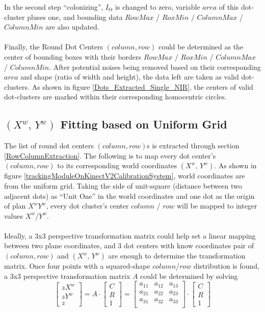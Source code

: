 %
In the second step \enquote{colonizing},  \(I_{\text{O}}\) is changed to zero, variable \(area\) of this dot-cluster pluses one, and bounding data \(RowMax\) / \(RoxMin\) / \(ColumnMax\) / \(ColumnMin\) are also updated.%
\\\\%
Finally, the Round Dot Centers \((column, row)\) could be determined as the center of bounding boxes with their borders \(RowMax\) / \(RoxMin\) / \(ColumnMax\) / \(ColumnMin\). After potential noises being removed based on their corresponding \(area\) and shape (ratio of width and height), the data left are taken as valid dot-clusters. As shown in figure \ref{Dots_Extracted_Single_NIR}, the centers of valid dot-clusters are marked within their corresponding homocentric circles.
%
%
\subsection{\((X^w, \,Y^w)\) Fitting based on Uniform Grid}
%
The list of round dot centers \((column, row)\)s is extracted through section \ref{RowColumnExtraction}. The following is to map every dot center's \((column, row)\) to its corresponding world coordinates \((X^w, \,Y^w)\). As shown in figure \ref{trackingModuleOnKinectV2CalibrationSystem}, world coordinates are from the uniform grid. Taking the side of unit-square (distance between two adjacent dots) as \enquote{Unit One} in the world coordinates and one dot as the origin of plan \(X^wY^w\), every dot cluster's center \(column\) / \(row\) will be mapped to integer values \(X^w\)/\(Y^w\). %
\\\\%
Ideally, a 3x3 perspective transformation matrix could help set a linear mapping between two plane coordinates, and 3 dot centers with know coordinates pair of \((column, row)\) and \((X^w, \,Y^w)\) are enough to determine the transformation matrix. Once four points with a squared-shape \(column\)/\(row\) distribution is found, a 3x3 perspective transformation matrix \(A\) could be determined by solving%
%
\begin{equation}
%
\left[ \begin{array}{c} %
zX^w \\ zY^w \\ z \end{array} \right] %
= %
A\cdot \left[ \begin{array}{c} %
C \\ R \\ 1 \end{array} \right] %
= %
\begin{bmatrix} 
a_{11} & a_{12} & a_{13} \\
a_{21} & a_{22} & a_{23} \\
a_{31} & a_{32} & a_{33} \\
\end{bmatrix}%
\cdot \left[ \begin{array}{c} %
C \\ R \\ 1 \end{array} \right] %
%
\end{equation}%
